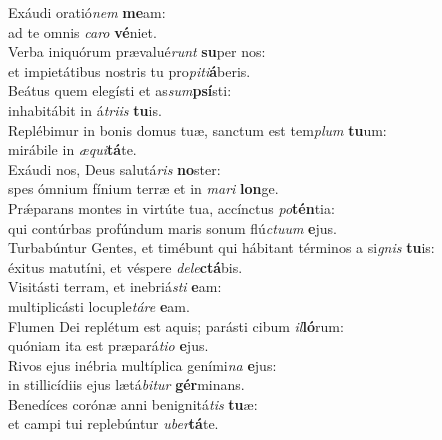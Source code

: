 \evenverse Exáudi oratió\textit{nem} \textbf{me}am:~\*\\
\evenverse ad te omnis \textit{ca}\textit{ro} \textbf{vé}niet.\\
\oddverse Verba iniquórum prævalué\textit{runt} \textbf{su}per nos:~\*\\
\oddverse et impietátibus nostris tu pro\textit{pi}\textit{ti}\textbf{á}beris.\\
\evenverse Beátus quem elegísti et as\textit{sum}\textbf{psí}sti:~\*\\
\evenverse inhabitábit in á\textit{tri}\textit{is} \textbf{tu}is.\\
\oddverse Replébimur in bonis domus tuæ, sanctum est tem\textit{plum} \textbf{tu}um:~\*\\
\oddverse mirábile in \textit{æ}\textit{qui}\textbf{tá}te.\\
\evenverse Exáudi nos, Deus salutá\textit{ris} \textbf{no}ster:~\*\\
\evenverse spes ómnium fínium terræ et in \textit{ma}\textit{ri} \textbf{lon}ge.\\
\oddverse Prǽparans montes in virtúte tua, accínctus \textit{po}\textbf{tén}tia:~\*\\
\oddverse qui contúrbas profúndum maris sonum flú\textit{ctu}\textit{um} \textbf{e}jus.\\
\evenverse Turbabúntur Gentes, et timébunt qui hábitant términos a si\textit{gnis} \textbf{tu}is:~\*\\
\evenverse éxitus matutíni, et véspere \textit{de}\textit{le}\textbf{ctá}bis.\\
\oddverse Visitásti terram, et inebriá\textit{sti} \textbf{e}am:~\*\\
\oddverse multiplicásti locuple\textit{tá}\textit{re} \textbf{e}am.\\
\evenverse Flumen Dei replétum est aquis; parásti cibum \textit{il}\textbf{ló}rum:~\*\\
\evenverse quóniam ita est præpará\textit{ti}\textit{o} \textbf{e}jus.\\
\oddverse Rivos ejus inébria multíplica geními\textit{na} \textbf{e}jus:~\*\\
\oddverse in stillicídiis ejus lætá\textit{bi}\textit{tur} \textbf{gér}minans.\\
\evenverse Benedíces corónæ anni benignitá\textit{tis} \textbf{tu}æ:~\*\\
\evenverse et campi tui replebúntur \textit{u}\textit{ber}\textbf{tá}te.\\
